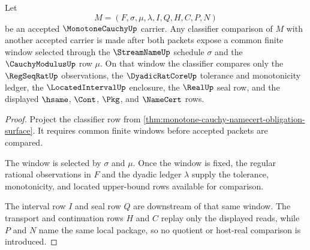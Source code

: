 \begin{theorem}
\label{thm:monotone-cauchy-common-window-classifier}
Let
$$
M=(F,\sigma,\mu,\lambda,I,Q,H,C,P,N)
$$
be an accepted $\MonotoneCauchyUp$ carrier. Any classifier comparison of $M$ with another accepted carrier is made after both packets expose a common finite window selected through the $\StreamNameUp$ schedule $\sigma$ and the $\CauchyModulusUp$ row $\mu$. On that window the classifier compares only the $\RegSeqRatUp$ observations, the $\DyadicRatCoreUp$ tolerance and monotonicity ledger, the $\LocatedIntervalUp$ enclosure, the $\RealUp$ seal row, and the displayed $\hsame$, $\Cont$, $\Pkg$, and $\NameCert$ rows.
\end{theorem}
\begin{proof}
Project the classifier row from \autoref{thm:monotone-cauchy-namecert-obligation-surface}. It requires common finite windows before accepted packets are compared.

The window is selected by $\sigma$ and $\mu$. Once the window is fixed, the regular rational observations in $F$ and the dyadic ledger $\lambda$ supply the tolerance, monotonicity, and located upper-bound rows available for comparison.

The interval row $I$ and seal row $Q$ are downstream of that same window. The transport and continuation rows $H$ and $C$ replay only the displayed reads, while $P$ and $N$ name the same local package, so no quotient or host-real comparison is introduced.
\end{proof}

